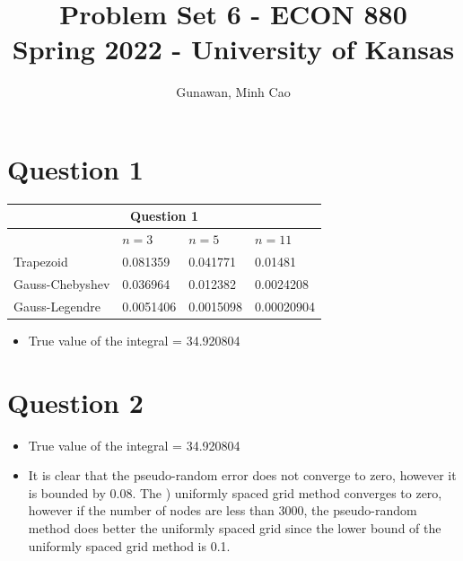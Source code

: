 \documentclass[11pt]{article}
\title{Problem Set 6 - ECON 880\\
	\small Spring 2022 - University of Kansas}
\author{Gunawan, Minh Cao}
\newcommand{\1}{\mathbbm{1}}
\begin{document}
\maketitle	
\section*{Question 1}






\begin{tabular}{ |p{3cm}||p{3cm}|p{3cm}|p{3cm}|  }
 \hline
 \multicolumn{4}{|c|}{Question 1} \\
 \hline
               & $n=3$ &$n=5$&$n=11$\\
 \hline
    Trapezoid      & 0.081359     &0.041771 &   0.01481\\
     Gauss-Chebyshev   &     0.036964    & 0.012382     &0.0024208\\
 Gauss-Legendre   &0.0051406   & 0.0015098 & 0.00020904\\
  \hline
\end{tabular}
\begin{itemize}
\item True value of the integral = 34.920804 
\end{itemize}

\section*{Question 2}
\begin{itemize}
\item True value of the integral = 34.920804 
\item It is clear that the  pseudo-random error does not converge to zero, however it is bounded by 0.08. The ) uniformly spaced grid method converges to zero, however if the number of nodes are less than 3000, the   pseudo-random method does better the uniformly spaced grid since the lower bound of the uniformly spaced grid method is 0.1.
\end{itemize}
\end{document}
